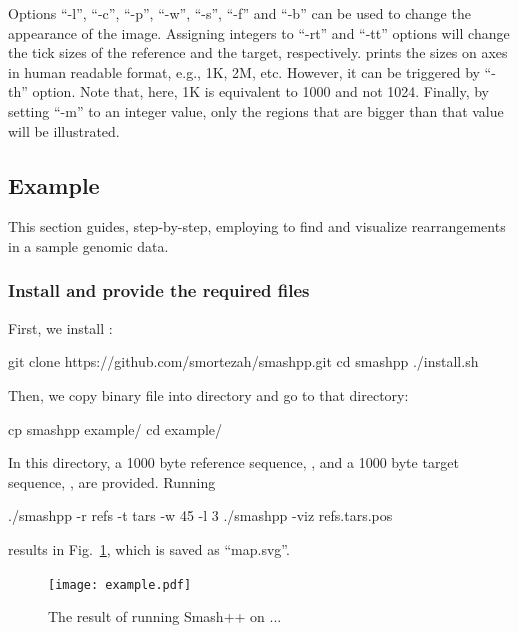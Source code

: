 Options ``-l'', ``-c'', ``-p'', ``-w'', ``-s'', ``-f'' and ``-b'' can be used to change the appearance of the image. Assigning integers to ``-rt'' and ``-tt'' options will change the tick sizes of the reference and the target, respectively. \smashpp prints the sizes on axes in human readable format, e.g., 1K, 2M, etc. However, it can be triggered by ``-th'' option. Note that, here, 1K is equivalent to 1000 and not 1024. Finally, by setting ``-m'' to an integer value, only the regions that are bigger than that value will be illustrated.

\subsection{Example}
This section guides, step-by-step, employing \smashpp to find and visualize rearrangements in a sample genomic data.

\subsubsection*{Install \smashpp and provide the required files}
First, we install \smashpp:
\begin{code}[style=bash]
  git clone https://github.com/smortezah/smashpp.git
  cd smashpp
  ./install.sh
\end{code}
Then, we copy  binary file into  directory and go to that directory:
\begin{code}[style=bash]
  cp smashpp example/
  cd example/
\end{code}
In this directory, a 1000 byte reference sequence, , and a 1000 byte target sequence, , are provided. Running
\begin{code}[style=bash]
  ./smashpp -r refs -t tars -w 45 -l 3
  ./smashpp -viz refs.tars.pos
\end{code}
results in Fig.~\ref{fig.example}, which is saved as ``map.svg''.

\begin{figure}[!h]
  \texttt{[image: example.pdf]}
  \caption{The result of running Smash++ on ...}
  \label{fig.example}
\end{figure}